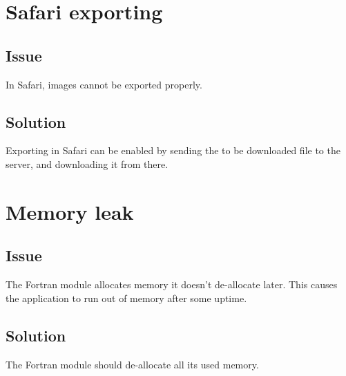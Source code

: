 \section{Safari exporting}

\subsection*{Issue}
In Safari, images cannot be exported properly.

\subsection*{Solution}
Exporting in Safari can be enabled by sending the to be downloaded file to the server, and downloading it from there.

\section{Memory leak}

\subsection*{Issue}
The Fortran module allocates memory it doesn't de-allocate later. This causes the application to run out of memory after some uptime.

\subsection*{Solution}
The Fortran module should de-allocate all its used memory.
